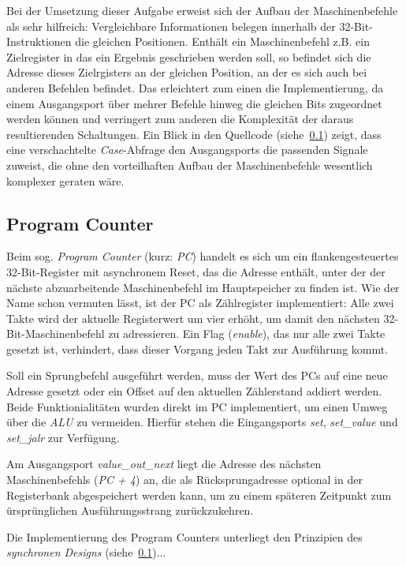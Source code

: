 Bei der Umsetzung dieser Aufgabe erweist sich der Aufbau der Maschinenbefehle als sehr hilfreich:
Vergleichbare Informationen belegen innerhalb der 32-Bit- Instruktionen die gleichen Positionen.
Enthält ein Maschinenbefehl z.B. ein Zielregister in das ein Ergebnis geschrieben werden soll, so befindet sich die Adresse dieses Zielrgisters an der gleichen Position, an der es sich auch bei anderen Befehlen befindet.
Das erleichtert zum einen die Implementierung, da einem Ausgangsport über mehrer Befehle hinweg die gleichen Bits zugeordnet werden können und verringert zum anderen die Komplexität der daraus resultierenden Schaltungen. 
Ein Blick in den Quellcode (siehe~\ref{}) zeigt, dass eine verschachtelte \textit{Case}-Abfrage den Ausgangsports die passenden Signale zuweist, die ohne den vorteilhaften Aufbau der Maschinenbefehle wesentlich komplexer geraten wäre.

\subsection{Program Counter}

Beim sog. \textit{Program Counter} (kurz: \textit{PC}) handelt es sich um ein flankengesteuertes 32-Bit-Register mit asynchronem Reset, das die Adresse enthält, unter der der nächste abzuarbeitende Maschinenbefehl im Hauptspeicher zu finden ist. 
Wie der Name schon vermuten lässt, ist der PC als Zählregister implementiert:
Alle zwei Takte wird der aktuelle Registerwert um vier erhöht, um damit den nächsten 32-Bit-Maschinenbefehl zu adressieren.
Ein Flag (\textit{enable}), das nur alle zwei Takte gesetzt ist, verhindert, dass dieser Vorgang jeden Takt zur Ausführung kommt.

Soll ein Sprungbefehl ausgeführt werden, muss der Wert des PCs auf eine neue Adresse gesetzt oder ein Offset auf den aktuellen Zählerstand addiert werden.
Beide Funktionialitäten wurden direkt im PC implementiert, um einen Umweg über die \textit{ALU} zu vermeiden.
Hierfür stehen die Eingangsports \textit{set}, \textit{set\_value} und \textit{set\_jalr} zur Verfügung.

Am Ausgangsport \textit{value\_out\_next} liegt die Adresse des nächsten Maschinenbefehls (\textit{PC + 4}) an, die als Rücksprungadresse optional in der Registerbank abgespeichert werden kann, um zu einem späteren Zeitpunkt zum ürsprünglichen Ausführungsstrang zurückzukehren.

Die Implementierung des Program Counters unterliegt den Prinzipien des \textit{synchronen Designs} (siehe~\ref{})...

